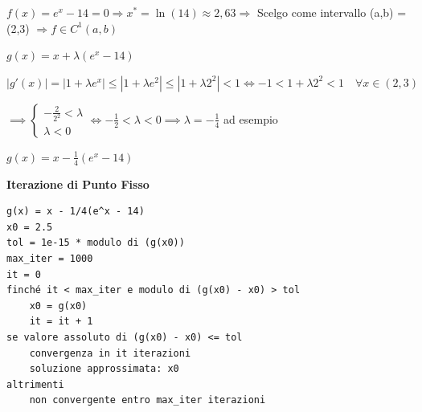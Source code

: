 \documentclass[12pt,a4paper]{article}
\begin{document}
$f(x) = e^x - 14 = 0 \Rightarrow x^* = \ln(14) \approx 2,63 \Rightarrow$ Scelgo come intervallo (a,b) = (2,3)
$\Rightarrow f \in C^1(a,b)$ 

$g(x) = x + \lambda(e^x - 14)$

$|g'(x)| = |1 + \lambda e^x| \leq |1+\lambda e^2| \leq |1+\lambda 2^2| < 1 \iff -1<1+\lambda 2^2<1 \quad \forall x \in (2,3)$

$\implies \begin{cases}-\frac{2}{2^2}<\lambda\\\lambda<0\end{cases}\iff-\frac{1}{2}<\lambda<0\implies\lambda=-\frac{1}{4}$ ad esempio

$g(x) = x - \frac{1}{4}(e^x - 14)$

\vspace{2em}
\noindent
\textbf{Iterazione di Punto Fisso}
\begin{verbatim}
g(x) = x - 1/4(e^x - 14)
x0 = 2.5
tol = 1e-15 * modulo di (g(x0))
max_iter = 1000
it = 0
finché it < max_iter e modulo di (g(x0) - x0) > tol
    x0 = g(x0)
    it = it + 1
se valore assoluto di (g(x0) - x0) <= tol
    convergenza in it iterazioni
    soluzione approssimata: x0
altrimenti
    non convergente entro max_iter iterazioni
\end{verbatim}

 \newpage
\noindent
{}
\end{document}
